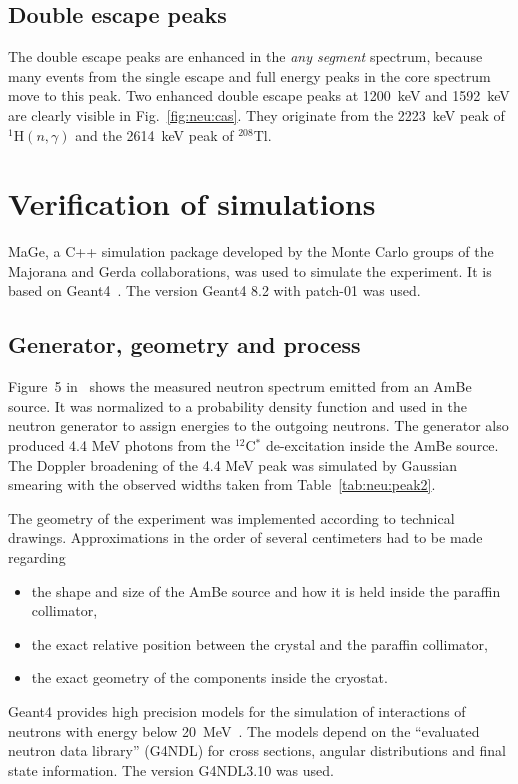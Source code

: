\subsection{Double escape peaks}
\label{sec:neu:dep}
The double escape peaks are enhanced in the \emph{any segment}
spectrum, because many events from the single escape and full energy
peaks in the core spectrum move to this peak. Two enhanced double
escape peaks at 1200~keV and 1592~keV are clearly visible in
Fig.~\ref{fig:neu:cas}. They originate from the 2223~keV peak of
$^{1}$H$(n,\gamma)$ and the 2614~keV peak of $^{208}$Tl.


\section{Verification of simulations}
\label{sec:neu:sim}
MaGe, a C++ simulation package developed by the Monte Carlo groups of the Majorana and Gerda collaborations, was used to simulate the experiment. It is based on Geant4~\cite{Gea03,Gea06}. The version Geant4 8.2 with patch-01 was used.

\subsection{Generator, geometry and process}
\label{sec:simdetail}
Figure~5 in~\cite{Mar95} shows the measured neutron spectrum emitted
from an AmBe source. It was normalized to a probability density
function and used in the neutron generator to assign energies to the
outgoing neutrons. The generator also produced 4.4 MeV photons from
the $^{12}$C$^{*}$ de-excitation inside the AmBe source. The Doppler
broadening of the 4.4 MeV peak was simulated by Gaussian smearing with
the observed widths taken from Table~\ref{tab:neu:peak2}.

The geometry of the experiment was implemented according to technical
drawings. Approximations in the order of several centimeters had to be
made regarding
\begin{itemize}
\item the shape and size of the AmBe source and how it is held inside
  the paraffin collimator,
\item the exact relative position between the crystal and the paraffin
  collimator,
\item the exact geometry of the components inside the cryostat.
\end{itemize}

Geant4 provides high precision models for the simulation of interactions of neutrons with energy below 20~MeV~\cite{Gea03,Gea06}. The models depend on the ``evaluated neutron data library'' (G4NDL) for cross sections, angular distributions and final state information. The version G4NDL3.10 was used.


